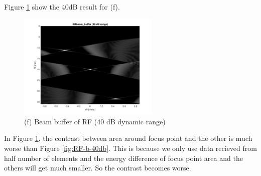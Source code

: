 \documentclass{article}
\begin{document}
Figure \ref{fig:RF-everyones-40db} show the 40dB result for (f).
\begin{figure}[H]
    \centering
    \includegraphics[width=0.6\textwidth]{src/RF/b-8-everyones.pdf}
    \caption{(f) Beam buffer of RF (40 dB dynamic range)}
    \label{fig:RF-everyones-40db}
\end{figure}
In Figure \ref{fig:RF-everyones-40db}, the contrast between area around focus point and the other is much worse than 
Figure \ref{fig:RF-b-40db}. This is because we only use data recieved from half number of elements and the energy difference
of focus point area and the others will get much smaller. So the contrast becomes worse.
\end{document}
